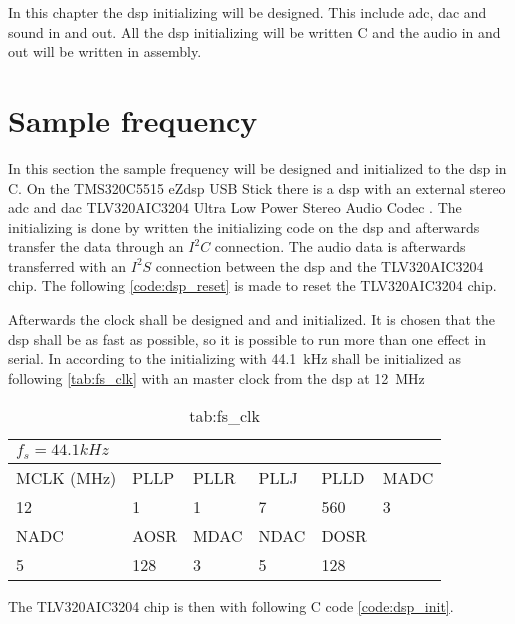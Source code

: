 \label{ch:disinit}
In this chapter the \gls{dsp} initializing will be designed. This include \gls{adc}, \gls{dac} and sound in and out. All the \gls{dsp} initializing will be written C and the audio in and out will be written in assembly. 

\section{Sample frequency}
In this section the sample frequency will be designed and initialized to the \gls{dsp} in C. \citep{slaa557}
On the TMS320C5515 eZdsp USB Stick there is a \gls{dsp} with an external stereo \gls{adc} and \gls{dac} TLV320AIC3204 Ultra Low Power Stereo Audio Codec \citep{TLV320AIC3204}. The initializing is done by written the initializing code on the \gls{dsp} and afterwards transfer the data through an $I^2C$ connection. The audio data is afterwards transferred with an $I^2S$ connection between the \gls{dsp} and the TLV320AIC3204 chip.
The following \autoref{code:dsp_reset} is made to reset the TLV320AIC3204 chip.


Afterwards the clock shall be designed and and initialized. It is chosen that the \gls{dsp} shall be as fast as possible, so it is possible to run more than one effect in serial. In according to \citep{slaa557} the initializing with \SI{44.1}{\kilo\hertz} shall be initialized as following \autoref{tab:fs_clk} with an master clock from the dsp at \SI{12}{\mega\hertz}

\begin{table}[]
\centering
\caption{tab:fs_clk}
\label{tab:fs_clk}
\begin{tabular}{|l|l|l|l|l|l|}
\hline
\multicolumn{6}{|l|}{$f_s=44.1kHz$}           \\ \hline
MCLK (MHz) & PLLP & PLLR & PLLJ & PLLD & MADC \\ \hline
12         & 1    & 1    & 7    & 560  & 3    \\ \hline
NADC       & AOSR & MDAC & NDAC & DOSR &      \\ \hline
5          & 128  & 3    & 5    & 128  &      \\ \hline
\end{tabular}
\end{table}


The TLV320AIC3204 chip is then with following C code  \autoref{code:dsp_init}.

